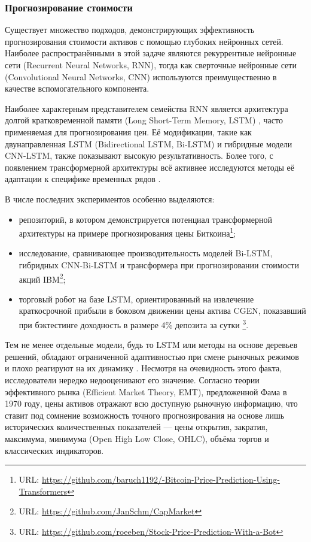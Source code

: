 \subsubsection{Прогнозирование стоимости}
Существует множество подходов, демонстрирующих эффективность прогнозирования стоимости активов с помощью
глубоких нейронных сетей. Наиболее распространёнными в этой задаче являются рекуррентные нейронные сети
(Recurrent Neural Networks, RNN), тогда как сверточные нейронные сети (Convolutional Neural Networks, CNN)
используются преимущественно в качестве вспомогательного компонента.

Наиболее характерным представителем семейства RNN является архитектура долгой кратковременной памяти
(Long Short-Term Memory, LSTM) \parencite{Hochreiter1997LSTM}, часто применяемая для прогнозирования
цен. Её модификации, такие как двунаправленная LSTM (Bidirectional LSTM, Bi-LSTM) и гибридные модели
CNN-LSTM, также показывают высокую результативность. Более того, с появлением трансформерной архитектуры
\parencite{vaswani2017attention} всё активнее исследуются методы её адаптации к специфике временных рядов
\parencite{wen2022transformers}.

В числе последних экспериментов особенно выделяются:

\begin{itemize}
    \item репозиторий, в котором демонстрируется потенциал трансформерной архитектуры на примере прогнозирования
    цены Биткоина\footnote{URL: \url{https://github.com/baruch1192/-Bitcoin-Price-Prediction-Using-Transformers}};
    \item исследование, сравнивающее производительность моделей Bi-LSTM, гибридных CNN-Bi-LSTM и трансформера
    при прогнозировании стоимости акций IBM\footnote{URL: \url{https://github.com/JanSchm/CapMarket}};
    \item торговый робот на базе LSTM, ориентированный на извлечение краткосрочной прибыли в боковом движении
    цены актива CGEN, показавший при бэктестинге доходность в размере 4\% депозита за сутки
    \footnote{URL: \url{https://github.com/roeeben/Stock-Price-Prediction-With-a-Bot}}.
\end{itemize}

Тем не менее отдельные модели, будь то LSTM или методы на основе деревьев решений, обладают ограниченной
адаптивностью при смене рыночных режимов и плохо реагируют на их динамику \parencite{Vukovi2024}.
Несмотря на очевидность этого факта, исследователи нередко недооценивают его значение. Согласно теории
эффективного рынка (Efficient Market Theory, EMT), предложенной Фама в 1970 году, цены активов отражают
всю доступную рыночную информацию, что ставит под сомнение возможность точного прогнозирования на основе
лишь исторических количественных показателей --- цены открытия, закратия, максимума, минимума (Open High
Low Close, OHLC), объёма торгов и классических индикаторов.

